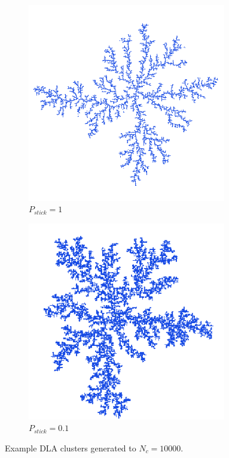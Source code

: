 \documentclass[10pt, twocolumn]{article} %
\begin{document}
\begin{figure}[h!]
\centering
  \begin{subfigure}[t]{0.45\textwidth}
    \centering
    \includegraphics[width=0.95\textwidth]{p1.png}
    \caption{$P_{stick} = 1$}
  \end{subfigure}
  \hfill
  \begin{subfigure}[t]{0.45\textwidth}
    \centering
    \includegraphics[width=0.95\textwidth]{p01.png}
    \caption{$P_{stick} = 0.1$}
  \end{subfigure}
  \caption{
    Example DLA clusters generated to $N_c = 10000$.
  }
\end{figure}
\end{document}
